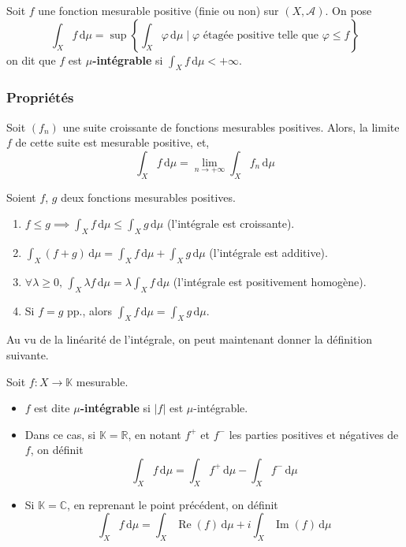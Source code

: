   \begin{definition}
    Soit $f$ une fonction mesurable positive (finie ou non) sur $(X, \mathcal{A})$. On pose
    \[ \int_X f \, \mathrm{d}\mu = \sup \left\{ \int_X \varphi \, \mathrm{d}\mu \mid \varphi \text{ étagée positive telle que } \varphi \leq f \right\} \]
    on dit que $f$ est \textbf{$\mu$-intégrable} si $\int_X f \, \mathrm{d}\mu < +\infty$.
  \end{definition}

  \subsubsection{Propriétés}

  \begin{theorem}
    Soit $(f_n)$ une suite croissante de fonctions mesurables positives. Alors, la limite $f$ de cette suite est mesurable positive, et,
    \[ \int_X f \, \mathrm{d}\mu = \lim_{n \rightarrow +\infty} \int_X f_n \, \mathrm{d}\mu \]
  \end{theorem}

  \begin{corollary}
    Soient $f$, $g$ deux fonctions mesurables positives.
    \begin{enumerate}[label=(\roman*)]
      \item $f \leq g \implies \int_X f \, \mathrm{d}\mu \leq \int_X g \, \mathrm{d}\mu$ (l'intégrale est croissante).
      \item $\int_X (f+g) \, \mathrm{d}\mu = \int_X f \, \mathrm{d}\mu + \int_X g \, \mathrm{d}\mu$ (l'intégrale est additive).
      \item $\forall \lambda \geq 0, \, \int_X \lambda f \, \mathrm{d}\mu = \lambda \int_X f \, \mathrm{d}\mu$ (l'intégrale est positivement homogène).
      \item Si $f = g$ pp., alors $\int_X f \, \mathrm{d}\mu = \int_X g \, \mathrm{d}\mu$.
    \end{enumerate}
  \end{corollary}

  Au vu de la linéarité de l'intégrale, on peut maintenant donner la définition suivante.


  \begin{definition}
    Soit $f : X \rightarrow \mathbb{K}$ mesurable.
    \begin{itemize}
      \item $f$ est dite \textbf{$\mu$-intégrable} si $\vert f \vert$ est $\mu$-intégrable.
      \item Dans ce cas, si $\mathbb{K} = \mathbb{R}$, en notant $f^+$ et $f^-$ les parties positives et négatives de $f$, on définit
      \[ \int_X f \, \mathrm{d}\mu = \int_X f^+ \, \mathrm{d}\mu - \int_X f^- \, \mathrm{d}\mu \]
      \item Si $\mathbb{K} = \mathbb{C}$, en reprenant le point précédent, on définit
      \[ \int_X f \, \mathrm{d}\mu = \int_X \operatorname{Re}(f) \, \mathrm{d}\mu + i \int_X \operatorname{Im}(f)  \, \mathrm{d}\mu \]
    \end{itemize}
  \end{definition}

